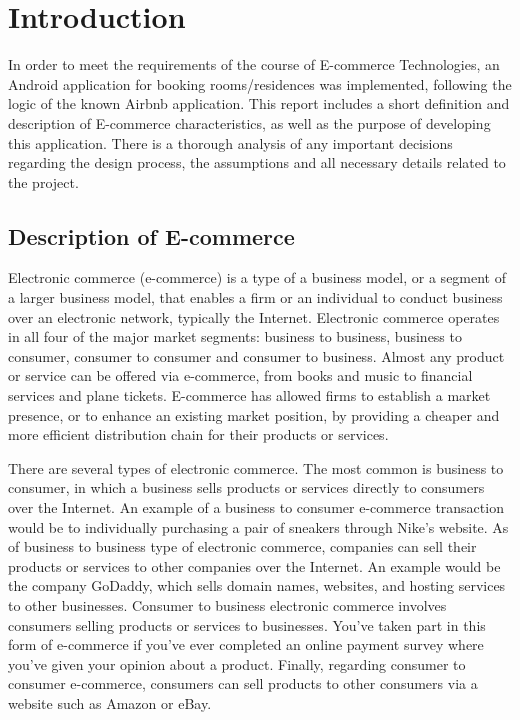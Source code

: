 \documentclass[12pt]{article}
\begin{document}
	\section{Introduction}
	
	In order to meet the requirements of the course of E-commerce Technologies, an Android application for booking rooms/residences was implemented, following the logic of the known Airbnb application. This report includes a short definition and description of E-commerce characteristics, as well as the purpose of developing this application. There is a thorough analysis of any important decisions regarding the design process, the assumptions and all necessary details related to the project. 
	
	\subsection{Description of E-commerce}
	
	
	Electronic commerce (e-commerce) is a type of a business model, or a segment of a larger business model, that enables a firm or an individual to conduct business over an electronic network, typically the Internet. Electronic commerce operates in all four of the major market segments: business to business, business to consumer, consumer to consumer and consumer to business. Almost any product or service can be offered via e-commerce, from books and music to financial services and plane tickets. E-commerce has allowed firms to establish a market presence, or to enhance an existing market position, by providing a cheaper and more efficient distribution chain for their products or services.
	
	
	There are several types of electronic commerce. The most common is business to consumer, in which a business sells products or services directly to consumers over the Internet. An example of a business to consumer e-commerce transaction would be to individually purchasing a pair of sneakers through Nike's website. As of business to business type of electronic commerce, companies can sell their products or services to other companies over the Internet. An example would be the company GoDaddy, which sells domain names, websites, and hosting services to other businesses. Consumer to business electronic commerce involves consumers selling products or services to businesses. You've taken part in this form of e-commerce if you've ever completed an online payment survey where you've given your opinion about a product. Finally, regarding consumer to consumer e-commerce, consumers can sell products to other consumers via a website such as Amazon or eBay.
	
\end{document}
